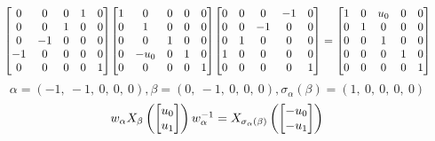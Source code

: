 \documentclass[11pt]{article}
\theoremstyle{definition}
\begin{document}
\[
\scaletoalign{\textwidth}{{\left[\begin{matrix}0 & 0 & 0 & 1 & 0\\0 & 0 & 1 & 0 & 0\\0 & -1 & 0 & 0 & 0\\-1 & 0 & 0 & 0 & 0\\0 & 0 & 0 & 0 & 1\end{matrix}\right]} {\left[\begin{matrix}1 & 0 & 0 & 0 & 0\\0 & 1 & 0 & 0 & 0\\0 & 0 & 1 & 0 & 0\\0 & - u_{0} & 0 & 1 & 0\\0 & 0 & 0 & 0 & 1\end{matrix}\right]} {\left[\begin{matrix}0 & 0 & 0 & -1 & 0\\0 & 0 & -1 & 0 & 0\\0 & 1 & 0 & 0 & 0\\1 & 0 & 0 & 0 & 0\\0 & 0 & 0 & 0 & 1\end{matrix}\right]} = {\left[\begin{matrix}1 & 0 & u_{0} & 0 & 0\\0 & 1 & 0 & 0 & 0\\0 & 0 & 1 & 0 & 0\\0 & 0 & 0 & 1 & 0\\0 & 0 & 0 & 0 & 1\end{matrix}\right]}}
\]
\[
\alpha = \left( -1, \  -1, \  0, \  0, \  0\right), \beta = \left( 0, \  -1, \  0, \  0, \  0\right), \sigma_{\alpha}(\beta) = \left( 1, \  0, \  0, \  0, \  0\right)
\]
\[
\scaletoalign{\textwidth}{w_{\alpha} X_{\beta}\left(\left[\begin{matrix}u_{0}\\u_{1}\end{matrix}\right]\right) w_{\alpha}^{-1} = X_{\sigma_{\alpha}\left(\beta\right)}\left(\left[\begin{matrix}- u_{0}\\- u_{1}\end{matrix}\right]\right)}
\]
\end{document}
